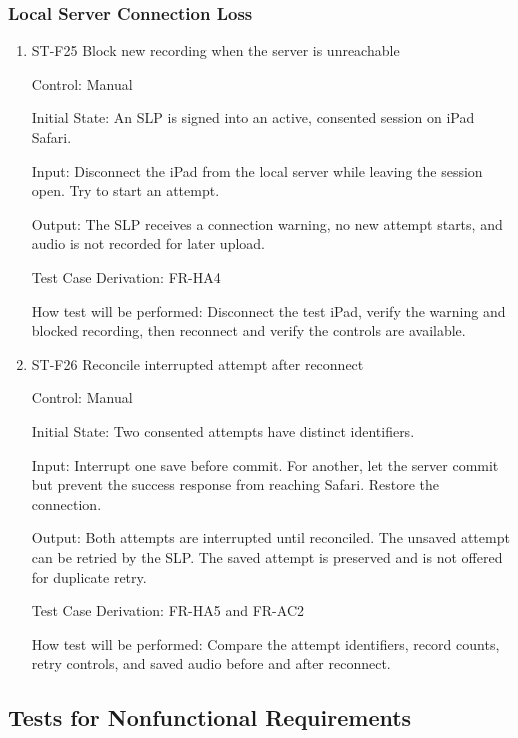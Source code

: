 \documentclass[12pt, titlepage]{article}
\begin{document}
\subsubsection{Local Server Connection Loss}

\begin{enumerate}

\item{ST-F25 Block new recording when the server is unreachable\\}

Control: Manual

Initial State: An SLP is signed into an active, consented session on iPad Safari.

Input: Disconnect the iPad from the local server while leaving the session open. Try to start an attempt.

Output: The SLP receives a connection warning, no new attempt starts, and audio is not recorded for later upload.

Test Case Derivation: FR-HA4

How test will be performed: Disconnect the test iPad, verify the warning and blocked recording, then reconnect and verify the controls are available.

\item{ST-F26 Reconcile interrupted attempt after reconnect\\}

Control: Manual

Initial State: Two consented attempts have distinct identifiers.

Input: Interrupt one save before commit. For another, let the server commit but prevent the success response from reaching Safari. Restore the connection.

Output: Both attempts are interrupted until reconciled. The unsaved attempt can be retried by the SLP. The saved attempt is preserved and is not offered for duplicate retry.

Test Case Derivation: FR-HA5 and FR-AC2

How test will be performed: Compare the attempt identifiers, record counts, retry controls, and saved audio before and after reconnect.

\end{enumerate}

\subsection{Tests for Nonfunctional Requirements}
\end{document}

